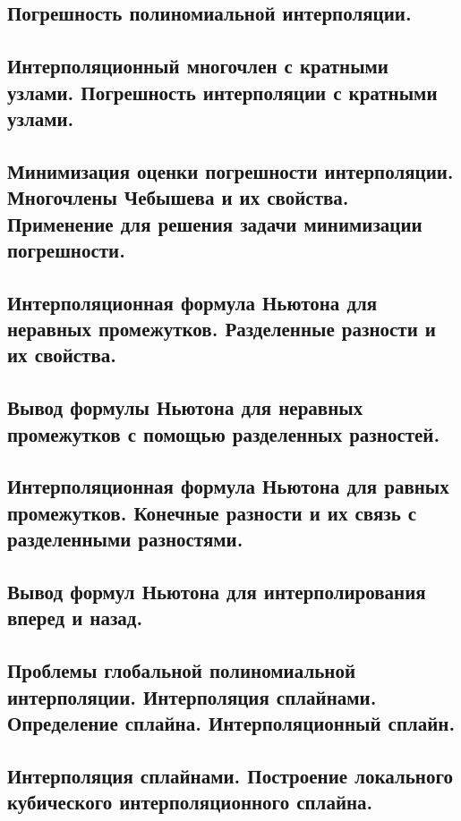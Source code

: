 \documentclass[14pt]{extarticle}
\begin{document}
\clearpage
\subsection{Погрешность полиномиальной интерполяции.}

\clearpage
\subsection{Интерполяционный многочлен с кратными узлами. Погрешность интерполяции с кратными узлами.}

\clearpage
\subsection{Минимизация оценки погрешности интерполяции. Многочлены Чебышева и их свойства. Применение для решения задачи минимизации погрешности.}

\clearpage
\subsection{Интерполяционная формула Ньютона для неравных промежутков. Разделенные разности и их свойства.}

\clearpage
\subsection{Вывод формулы Ньютона для неравных промежутков с помощью разделенных разностей.}

\clearpage
\subsection{Интерполяционная формула Ньютона для равных промежутков. Конечные разности и их связь с разделенными разностями.}

\clearpage
\subsection{Вывод формул Ньютона для интерполирования вперед и назад.}

\clearpage
\subsection{Проблемы глобальной полиномиальной интерполяции. Интерполяция сплайнами. Определение сплайна. Интерполяционный сплайн.}

\clearpage
\subsection{Интерполяция сплайнами. Построение локального кубического интерполяционного сплайна.}
\end{document}
